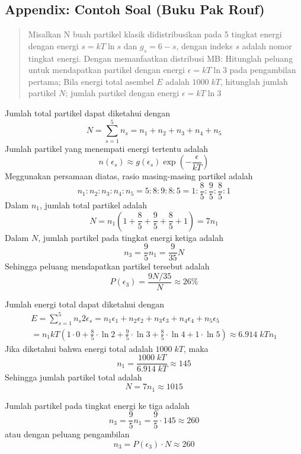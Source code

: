 \documentclass[../../../Main.tex]{subfiles}
\begin{document}
\subsection*{Appendix: Contoh Soal (Buku Pak Rouf)}
\begin{quotation}
    Misalkan N buah partikel klasik didistribusikan pada 5 tingkat energi dengan energi $s = kT \ln s$ dan $g_s = 6-s$, dengan indeks $s$ adalah nomor tingkat energi. Dengan memanfaatkan distribusi MB: Hitunglah peluang untuk mendapatkan partikel dengan energi $\epsilon = kT \ln 3$ pada pengambilan pertama; Bila energi total asembel $E$ adalah $1000 \;kT$, hitunglah jumlah partikel $N$; jumlah partikel dengan energi $\epsilon=kT \ln 3$
\end{quotation}

Jumlah total partikel dapat diketahui dengan 
\begin{equation*}
    N=\sum_{s=1}^{5}n_s=n_1+n_2+n_3+n_4+n_5
\end{equation*}
Jumlah partikel yang menempati energi tertentu adalah
\begin{equation*}
    n(\epsilon_s)\approx g(\epsilon_s)\exp\left(-\frac{\epsilon}{kT}\right)
\end{equation*}
Meggunakan persamaan diatas, rasio masing-masing partikel adalah
\begin{equation*}
    n_1:n_2:n_3:n_4:n_5=5:8:9:8:5=1:\frac{8}{5}:\frac{9}{5}:\frac{8}{5}:1
\end{equation*} 
Dalam $n_1$, jumlah total partikel adalah
\begin{equation*}
    N=n_1\left(1+\frac{8}{5}+\frac{9}{5}+\frac{8}{5}+1\right)=7n_1
\end{equation*}
Dalam $N$, jumlah partikel pada tingkat energi ketiga adalah
\begin{equation*}
    n_3=\frac{9}{5}n_1=\frac{9}{35}N
\end{equation*}
Sehingga peluang mendapatkan partikel tersebut adalah
\begin{equation*}
    P(\epsilon_3)=\frac{9N/35}{N}\approx26\%
\end{equation*}

Jumlah energi total dapat diketahui dengan
\begin{multline*}
    E=\sum_{s=1}^{5}n_s2\epsilon_s=n_1\epsilon_1+n_2\epsilon_2+n_3\epsilon_3+n_4\epsilon_4+n_5\epsilon_5 \\
    =n_1kT\left(1\cdot0+\frac{8}{5}\cdot\ln 2+\frac{9}{5}\cdot\ln 3+\frac{8}{5}\cdot\ln 4+1\cdot\ln 5\right)\approx6.914\;kTn_1
\end{multline*}
Jika diketahui bahwa energi total adalah $1000\;kT$, maka 
\begin{equation*}
    n_1=\frac{1000\;kT}{6.914\;kT}\approx145
\end{equation*}
Sehingga jumlah partikel total adalah
\begin{equation*}
    N=7n_1\approx1015
\end{equation*}

Jumlah partikel pada tingkat energi ke tiga adalah
\begin{equation*}
    n_3=\frac{9}{5}n_1=\frac{9}{5}\cdot145\approx260
\end{equation*}
atau dengan peluang pengambilan
\begin{equation*}
    n_3=P(\epsilon_3)\cdot N\approx 260
\end{equation*}
\end{document}

